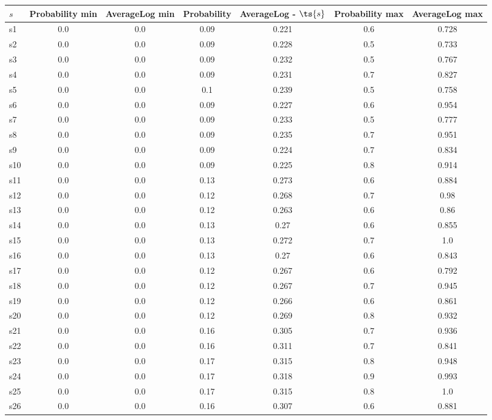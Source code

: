 \documentclass{article}
\begin{document}
\noindent\begin{tabular}{|l|c|c|c|c|c|c|}
\hline
$s$& Probability min & AverageLog min & Probability & AverageLog - $\ts{s}$ & Probability max & AverageLog max\\
\hline
s1 &0.0 & 0.0 & 0.09 & 0.221 & 0.6 & 0.728\\
\hline
s2 &0.0 & 0.0 & 0.09 & 0.228 & 0.5 & 0.733\\
\hline
s3 &0.0 & 0.0 & 0.09 & 0.232 & 0.5 & 0.767\\
\hline
s4 &0.0 & 0.0 & 0.09 & 0.231 & 0.7 & 0.827\\
\hline
s5 &0.0 & 0.0 & 0.1 & 0.239 & 0.5 & 0.758\\
\hline
s6 &0.0 & 0.0 & 0.09 & 0.227 & 0.6 & 0.954\\
\hline
s7 &0.0 & 0.0 & 0.09 & 0.233 & 0.5 & 0.777\\
\hline
s8 &0.0 & 0.0 & 0.09 & 0.235 & 0.7 & 0.951\\
\hline
s9 &0.0 & 0.0 & 0.09 & 0.224 & 0.7 & 0.834\\
\hline
s10 &0.0 & 0.0 & 0.09 & 0.225 & 0.8 & 0.914\\
\hline
s11 &0.0 & 0.0 & 0.13 & 0.273 & 0.6 & 0.884\\
\hline
s12 &0.0 & 0.0 & 0.12 & 0.268 & 0.7 & 0.98\\
\hline
s13 &0.0 & 0.0 & 0.12 & 0.263 & 0.6 & 0.86\\
\hline
s14 &0.0 & 0.0 & 0.13 & 0.27 & 0.6 & 0.855\\
\hline
s15 &0.0 & 0.0 & 0.13 & 0.272 & 0.7 & 1.0\\
\hline
s16 &0.0 & 0.0 & 0.13 & 0.27 & 0.6 & 0.843\\
\hline
s17 &0.0 & 0.0 & 0.12 & 0.267 & 0.6 & 0.792\\
\hline
s18 &0.0 & 0.0 & 0.12 & 0.267 & 0.7 & 0.945\\
\hline
s19 &0.0 & 0.0 & 0.12 & 0.266 & 0.6 & 0.861\\
\hline
s20 &0.0 & 0.0 & 0.12 & 0.269 & 0.8 & 0.932\\
\hline
s21 &0.0 & 0.0 & 0.16 & 0.305 & 0.7 & 0.936\\
\hline
s22 &0.0 & 0.0 & 0.16 & 0.311 & 0.7 & 0.841\\
\hline
s23 &0.0 & 0.0 & 0.17 & 0.315 & 0.8 & 0.948\\
\hline
s24 &0.0 & 0.0 & 0.17 & 0.318 & 0.9 & 0.993\\
\hline
s25 &0.0 & 0.0 & 0.17 & 0.315 & 0.8 & 1.0\\
\hline
s26 &0.0 & 0.0 & 0.16 & 0.307 & 0.6 & 0.881\\

\end{tabular}
\end{document}
